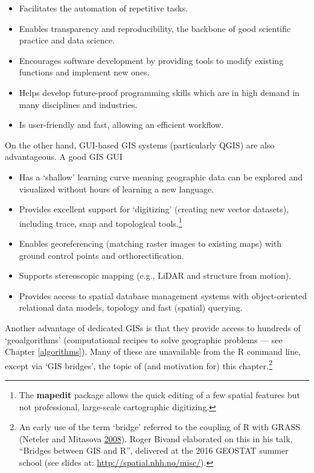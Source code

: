 \documentclass[]{krantz}
\providecommand{\tightlist}{%
  \setlength{\itemsep}{0pt}\setlength{\parskip}{0pt}}
\let\rmarkdownfootnote\footnote%
\def\footnote{\protect\rmarkdownfootnote}
\begin{document}
\begin{itemize}
\tightlist
\item
  Facilitates the automation of repetitive tasks.
\item
  Enables transparency and reproducibility, the backbone of good scientific practice and data science.
\item
  Encourages software development by providing tools to modify existing functions and implement new ones.
\item
  Helps develop future-proof programming skills which are in high demand in many disciplines and industries.
\item
  Is user-friendly and fast, allowing an efficient workflow.
\end{itemize}

On the other hand, GUI-based GIS systems (particularly QGIS) are also advantageous.
A good GIS GUI

\begin{itemize}
\tightlist
\item
  Has a `shallow' learning curve meaning geographic data can be explored and visualized without hours of learning a new language.
\item
  Provides excellent support for `digitizing' (creating new vector datasets), including trace, snap and topological tools.\footnote{The \textbf{mapedit} package allows the quick editing of a few spatial features but not professional, large-scale cartographic digitizing.}
\item
  Enables georeferencing (matching raster images to existing maps) with ground control points and orthorectification.
\item
  Supports stereoscopic mapping (e.g., LiDAR and structure from motion).
\item
  Provides access to spatial database management systems with object-oriented relational data models, topology and fast (spatial) querying.
\end{itemize}

Another advantage of dedicated GISs is that they provide access to hundreds of `geoalgorithms' (computational recipes to solve geographic problems --- see Chapter \ref{algorithms}).
Many of these are unavailable from the R command line, except via `GIS bridges', the topic of (and motivation for) this chapter.\footnote{An early use of the term `bridge' referred to the coupling of R with GRASS (Neteler and Mitasova \protect\hyperlink{ref-neteler_open_2008}{2008}).
  Roger Bivand elaborated on this in his talk, ``Bridges between GIS and R'', delivered at the 2016 GEOSTAT summer school (see slides at: \url{http://spatial.nhh.no/misc/}).
}
\end{document}
